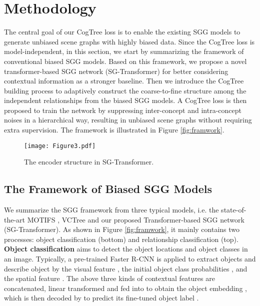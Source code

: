 \documentclass[letterpaper]{article} \usepackage{aaai21}  \usepackage{times}  \usepackage{helvet} \usepackage{courier}  \usepackage[hyphens]{url}  \usepackage{graphicx} \urlstyle{rm} \def\UrlFont{\rm}  \usepackage{natbib}  \usepackage{caption} \frenchspacing  \setlength{\pdfpagewidth}{8.5in}  \setlength{\pdfpageheight}{11in}  \usepackage{amsmath,amsthm}
\begin{document}
\section{Methodology}
\label{sec:method}

The central goal of our CogTree loss is to enable the existing SGG models to generate  unbiased scene graphs with highly biased data. Since the CogTree loss is model-independent, in this section, we start by summarizing the framework of conventional biased SGG models. Based on this framework, we propose a novel transformer-based SGG network (SG-Transformer) for better considering contextual information as a stronger baseline. Then we introduce the CogTree building process to adaptively construct the coarse-to-fine structure among the independent relationships from the biased SGG models. A CogTree loss is then proposed to train the network by suppressing inter-concept and intra-concept noises in a hierarchical way, resulting in unbiased scene graphs without  requiring extra  supervision. 
The framework is illustrated in Figure \ref{fig:framwork}.   

\begin{figure}[t]
    \centering
    \texttt{[image: Figure3.pdf]}
    \caption{The encoder structure in SG-Transformer.}
    \label{fig:SGTransformer}
\end{figure}

\subsection{The Framework of Biased SGG Models}
\label{ssec:biasedModel}

We summarize the SGG framework from three typical models, i.e. the state-of-the-art MOTIFS \cite{zellers2018neural}, VCTree \cite{tang2019learning} and our proposed Transformer-based SGG network (SG-Transformer). As shown in Figure \ref{fig:framwork}, it mainly contains two processes: object classification (bottom) and relationship classification (top).
\\
\textbf{Object classification} aims to detect the object locations and object classes in an image. Typically, a pre-trained Faster R-CNN \cite{ren2015faster} is applied to extract  objects  and describe object  by the visual feature , the initial object class probabilities , and the spatial feature . The above three kinds of contextual features are concatenated, linear transformed and fed into  to obtain the object embedding , which is then decoded by   to predict its fine-tuned object label .
\end{document}

